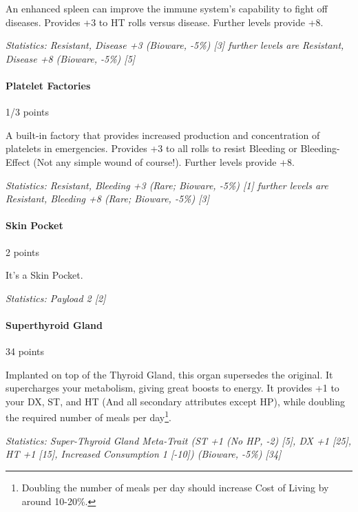 \begin{multicols*}{3}
	An enhanced spleen can improve the immune system's capability to fight off diseases. Provides +3 to HT rolls versus disease.  Further levels provide +8.
	
	\textit{\textcolor{OliveGreen}{Statistics: Resistant, Disease +3 (Bioware, -5\%) [3] further levels are Resistant, Disease +8 (Bioware, -5\%) [5]}}
	
	\paragraph{Platelet Factories}
	\begin{flushright}
		1/3 points
	\end{flushright}

	A built-in factory that provides increased production and concentration of platelets in emergencies. Provides +3 to all rolls to resist Bleeding or Bleeding-Effect (Not any simple wound of course!). Further levels provide +8.
	
	\textit{\textcolor{OliveGreen}{Statistics: Resistant, Bleeding +3 (Rare; Bioware, -5\%) [1] further levels are Resistant, Bleeding +8 (Rare; Bioware, -5\%) [3]}}
	
	\paragraph{Skin Pocket}\label{skin_pocket}
	\begin{flushright}
		2 points
	\end{flushright}
	
	It's a Skin Pocket. 
	
	\textit{\textcolor{OliveGreen}{Statistics: Payload 2 [2]}}
	
	\paragraph{Superthyroid Gland}
	\begin{flushright}
		34 points
	\end{flushright}
	
	Implanted on top of the Thyroid Gland, this organ supersedes the original. It supercharges your metabolism, giving great boosts to energy. It provides +1 to your DX, ST, and HT (And all secondary attributes except HP), while doubling the required number of meals per day\footnote{Doubling the number of meals per day should increase Cost of Living by around 10-20\%.}.
	
	\textit{\textcolor{OliveGreen}{Statistics: Super-Thyroid Gland Meta-Trait (ST +1 (No HP, -2) [5], DX +1 [25], HT +1 [15], Increased Consumption 1 [-10]) (Bioware, -5\%) [34]}}
	

\end{multicols*}
